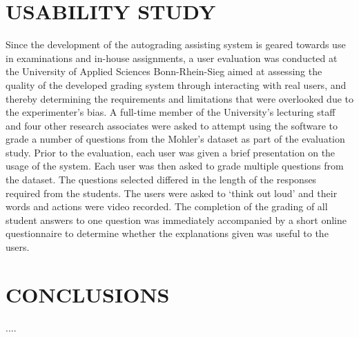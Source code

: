 \documentclass[letterpaper, 10 pt, conference]{ieeeconf}  %
\begin{document}
\section{USABILITY STUDY} 
Since the development of the autograding assisting system is geared towards use in examinations and in-house assignments, a user evaluation was conducted at the University of Applied Sciences Bonn-Rhein-Sieg aimed at assessing the quality of the developed grading system through interacting with real users, and thereby determining the requirements and limitations that were overlooked due to the experimenter's bias. A full-time member of the University's lecturing staff and four other research associates were asked to attempt using the software to grade a number of questions from the Mohler's dataset as part of the evaluation study. Prior to the evaluation, each user was given a brief presentation on the usage of the system. Each user was then asked to grade multiple questions from the dataset. The questions selected differed in the length of the responses required from the students. The users were asked to `think out loud' and their words and actions were video recorded. The completion of the grading of all student answers to one question was immediately accompanied by a short online questionnaire to determine whether the explanations given was useful to the users.
\section{CONCLUSIONS}

....

\addtolength{\textheight}{-12cm}   %







\end{document}
